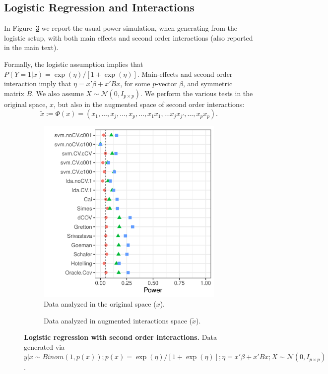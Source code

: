 \documentclass[]{bio}
\begin{document}
\subsection{Logistic Regression and Interactions}

In Figure~\ref{fig:logistic-main-and-interactions} we report the usual power simulation, when generating from the logistic setup, with both main effects and second order interactions (also reported in the main text).

Formally, the logistic assumption implies that 
$P(Y=1|x)=\exp(\eta)/[1+\exp(\eta)]$.
Main-effects and second order interaction imply that 
$\eta=x'\beta+x'Bx$, for some $p$-vector $\beta$, and symmetric matrix $B$.
We also assume $X\sim \mathcal{N}(0,I_{p\times p})$.
We perform the various tests in the original space, $x$, but also in the augmented space of second order interactions: 
$$\tilde{x}:=\Phi(x)=(x_1,\dots,x_j,\dots,x_p,\dots,x_1x_1,\dots x_jx_{j'},\dots,x_p x_p).$$


\begin{figure}[th]
	\centering
	\begin{subfigure}[t]{.45\columnwidth}
		\centering
		\includegraphics[width=1\columnwidth]{"art/file42"}
		\caption{Data analyzed in the original space ($x$).}
		\label{fig:interactions-in-original-space}
	\end{subfigure}
	\begin{subfigure}[t]{.45\columnwidth}
		\centering
		\caption{Data analyzed in augmented interactions space ($\tilde x$).}
		\label{fig:interactions-in-augmented-space}
	\end{subfigure}
	\caption{\textbf{Logistic regression with second order interactions.} 
		Data generated via $y|x \sim Binom(1,p(x));
		p(x)=\exp(\eta)/[1+\exp(\eta)];
		\eta=x'\beta+x'Bx; 
		X\sim \mathcal{N}(0,I_{p\times p})$. } 
	\label{fig:logistic-main-and-interactions}
\end{figure}
\end{document}
